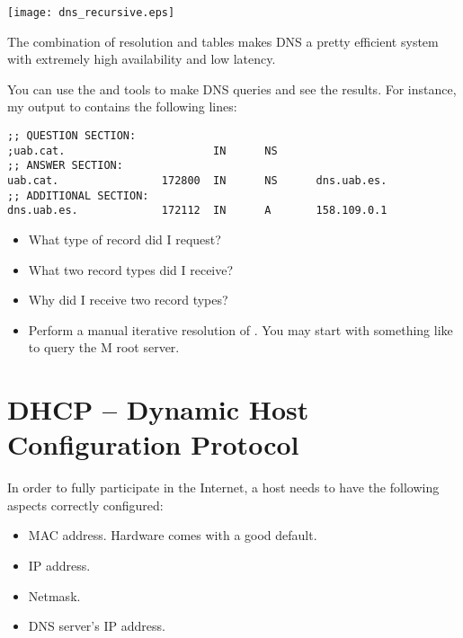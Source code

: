 \begin{center}
\texttt{[image: dns\_recursive.eps]}
\end{center}

The combination of  resolution and  tables makes
DNS a pretty efficient system with extremely high availability and low latency.

\begin{exercise}
You can use the  and  tools to make DNS queries
and see the results. For instance, my output to 
contains the following lines:

\vspace{0.25cm}
\begin{verbatim}
;; QUESTION SECTION:
;uab.cat.                       IN      NS
;; ANSWER SECTION:
uab.cat.                172800  IN      NS      dns.uab.es.
;; ADDITIONAL SECTION:
dns.uab.es.             172112  IN      A       158.109.0.1
\end{verbatim}
\vspace{0.25cm}

\begin{itemize}
\item What type of record did I request?
\item What two record types did I receive?
\item Why did I receive two record types?
\item Perform a manual iterative resolution of .
  You may start with something like 
  to query the M root server.
\end{itemize}
\end{exercise}


\section{DHCP -- Dynamic Host Configuration Protocol}

In order to fully participate in the Internet, a host needs to have 
the following aspects correctly configured:
\begin{itemize}
\item MAC address. Hardware comes with a good default.
\item IP address.
\item Netmask.
\item DNS server's IP address.
\end{itemize}

